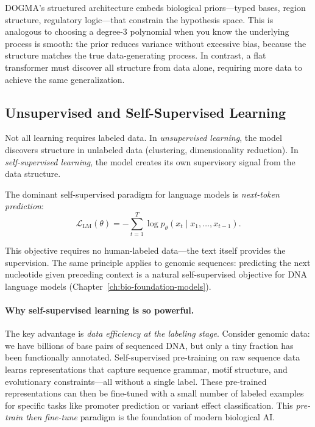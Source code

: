 \begin{bioinsight}
DOGMA's structured architecture embeds biological priors---typed bases, region structure, regulatory logic---that constrain the hypothesis space. This is analogous to choosing a degree-3 polynomial when you know the underlying process is smooth: the prior reduces variance without excessive bias, because the structure matches the true data-generating process. In contrast, a flat transformer must discover all structure from data alone, requiring more data to achieve the same generalization.
\end{bioinsight}

\subsection{Unsupervised and Self-Supervised Learning}

Not all learning requires labeled data. In \emph{unsupervised learning}, the model discovers structure in unlabeled data (clustering, dimensionality reduction). In \emph{self-supervised learning}, the model creates its own supervisory signal from the data structure.

The dominant self-supervised paradigm for language models is \emph{next-token prediction}:
\begin{equation}
\mathcal{L}_{\text{LM}}(\theta) = -\sum_{t=1}^{T} \log p_\theta(x_t \mid x_1, \ldots, x_{t-1}).
\label{eq:lm-loss}
\end{equation}

This objective requires no human-labeled data---the text itself provides the supervision. The same principle applies to genomic sequences: predicting the next nucleotide given preceding context is a natural self-supervised objective for DNA language models (Chapter~\ref{ch:bio-foundation-models}).

\paragraph{Why self-supervised learning is so powerful.} The key advantage is \emph{data efficiency at the labeling stage}. Consider genomic data: we have billions of base pairs of sequenced DNA, but only a tiny fraction has been functionally annotated. Self-supervised pre-training on raw sequence data learns representations that capture sequence grammar, motif structure, and evolutionary constraints---all without a single label. These pre-trained representations can then be fine-tuned with a small number of labeled examples for specific tasks like promoter prediction or variant effect classification. This \emph{pre-train then fine-tune} paradigm is the foundation of modern biological AI.

